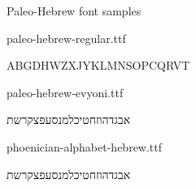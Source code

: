 \documentclass[11pt]{book}
\begin{document}
\begin{center}
  {\Large Paleo-Hebrew font samples}

  \vspace{2em}
  {\large paleo-hebrew-regular.ttf}\par
  \vspace{0.6em}
  {\RegularPaleo\fontsize{28}{38}\selectfont ABGDHWZXJYKLMNSOPCQRVT\par}

  \vspace{3em}
  {\large paleo-hebrew-evyoni.ttf}\par
  \vspace{0.6em}
  {\EvyoniPaleo\fontsize{24}{34}\selectfont אבגדהוזחטיכלמנסעפצקרשת\par}

  \vspace{3em}
  {\large phoenician-alphabet-hebrew.ttf}\par
  \vspace{0.6em}
  {\PhoenicianAlphabet\fontsize{28}{38}\selectfont אבגדהוזחטיכלמנסעפצקרשת\par}
\end{center}
\end{document}
